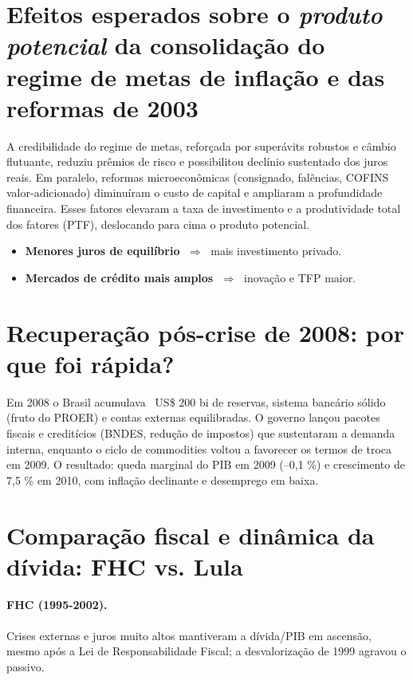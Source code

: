 \documentclass{sciposter}
\begin{document}
\begin{multicols}{3}
\section{\textbf{Efeitos esperados sobre o \emph{produto potencial} da consolidação do regime de metas de inflação e das reformas de 2003}}

A credibilidade do regime de metas, reforçada por superávits robustos e câmbio flutuante, reduziu prêmios de risco e possibilitou declínio sustentado dos juros reais. Em paralelo, reformas microeconômicas (consignado, falências, COFINS valor-adicionado) diminuíram o custo de capital e ampliaram a profundidade financeira. Esses fatores elevaram a taxa de investimento e a produtividade total dos fatores (PTF), deslocando para cima o produto potencial. 

\begin{itemize}
  \item \textbf{Menores juros de equilíbrio} $\;\Rightarrow\;$ mais investimento privado.
  \item \textbf{Mercados de crédito mais amplos} $\;\Rightarrow\;$ inovação e TFP maior.
\end{itemize}

\section{\textbf{Recuperação pós-crise de 2008: por que foi rápida?}}

Em 2008 o Brasil acumulava ~US\$ 200 bi de reservas, sistema bancário sólido (fruto do PROER) e contas externas equilibradas. O governo lançou pacotes fiscais e creditícios (BNDES, redução de impostos) que sustentaram a demanda interna, enquanto o ciclo de commodities voltou a favorecer os termos de troca em 2009. O resultado: queda marginal do PIB em 2009 (–0,1 \%) e crescimento de 7,5 \% em 2010, com inflação declinante e desemprego em baixa. 

\section{\textbf{Comparação fiscal e dinâmica da dívida: FHC vs. Lula}}

\paragraph{FHC (1995-2002).} Crises externas e juros muito altos mantiveram a dívida/PIB em ascensão, mesmo após a Lei de Responsabilidade Fiscal; a desvalorização de 1999 agravou o passivo.   


\end{multicols}
\end{document}
